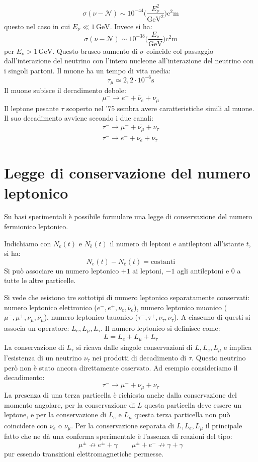 \[
\sigma(\nu-\mathcal{N})\sim 10^{-44}\biggl(\frac{E_{\nu}^2}{\si{\giga\electronvolt}^2}\biggr)\si{\square\centi\meter}
\]
questo nel caso in cui $E_{\nu}\ll 1\,\si{\giga\electronvolt}$. Invece si ha:
\[
\sigma(\nu-\mathcal{N})\sim 10^{-38}\biggl(\frac{E_{\nu}}{\si{\giga\electronvolt}}\biggr)\si{\square\centi\meter}
\]
per $E_{\nu}> 1\,\si{\giga\electronvolt}$. Questo brusco aumento di $\sigma$ coincide col passaggio
dall'interazione del neutrino con l'intero nucleone all'interazione del neutrino con i singoli partoni.
Il muone ha un tempo di vita media:
\[
\tau_{\mu}\simeq 2,2\cdot 10^{-6}\si{\second}
\]
Il muone subisce il decadimento debole:
\[
\mu^-\rightarrow e^-+\bar{\nu}_e+\nu_{\mu}
\]
Il leptone pesante $\tau$ scoperto nel '75 sembra avere caratteristiche simili al muone. Il suo decadimento
avviene secondo i due canali:
\begin{gather}
\tau^-\rightarrow\mu^-+\bar{\nu_{\mu}}+\nu_{\tau}\\
\tau^-\rightarrow e^-+\bar{\nu}_e+\nu_{\tau}
\end{gather}

\section{Legge di conservazione del numero leptonico}
Su basi sperimentali è possibile formulare una legge di conservazione del numero fermionico leptonico.

Indichiamo con $N_e(t)$ e $N_{\bar{e}}(t)$ il numero di leptoni e antileptoni all'istante $t$, si ha:
\[
N_e(t)-N_{\bar{e}}(t)=\text{costanti}
\]
Si può associare un numero leptonico $+1$ ai leptoni, $-1$ agli antileptoni e $0$ a tutte le altre particelle.

Si vede che esistono tre sottotipi di numero leptonico separatamente conservati: numero leptonico
elettronico ($e^-,e^+,\nu_e,\bar{\nu}_e$), numero leptonico muonico ($\mu^-,\mu^+,\nu_{\mu},\bar{\nu}_{\mu}$),
numero leptonico tauonico ($\tau^-,\tau^+,\nu_{\tau},\bar{\nu}_{\tau}$).
A ciascuno di questi si associa un operatore: $L_e,L_{\mu},L_{\tau}$. Il numero leptonico si definisce come:
\[
L=L_e+L_{\mu}+L_{\tau}
\]
La conservazione di $L_{\tau}$ si ricava dalle singole conservazioni di $L,L_e,L_{\mu}$ e implica l'esistenza di un neutrino $\nu_{\tau}$ nei prodotti di decadimento di $\tau$.
Questo neutrino però non è stato ancora direttamente osservato. Ad esempio consideriamo il decadimento:
\[
\tau^-\rightarrow\mu^-+\nu_{\mu}+\nu_{\tau}
\]
La presenza di una terza particella è richiesta anche dalla conservazione del momento angolare, per la
conservazione di $L$ questa particella deve essere un leptone, e per la conservazione di $L_e$ e $L_{\mu}$ questa
terza particella non può coincidere con $\nu_e$ o $\nu_{\mu}$.
Per la conservazione separata di $L,L_e,L_{\mu}$ il principale fatto che ne dà una conferma sperimentale è
l'assenza di reazioni del tipo:
\[
\mu^{\pm}\nrightarrow e^{\pm}+\gamma\qquad\mu^{\pm}+e^-\nrightarrow\gamma+\gamma
\]
pur essendo transizioni elettromagnetiche permesse.

